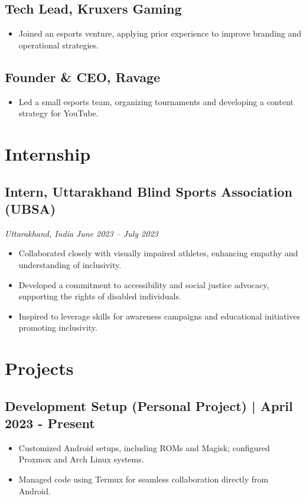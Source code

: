 \documentclass[a4paper,10pt]{article}
\begin{document}
\subsection*{Tech Lead, Kruxers Gaming}
\begin{itemize}[left=0em, itemsep=3pt]
    \item Joined an esports venture, applying prior experience to improve branding and operational strategies.
\end{itemize}

\subsection*{Founder \& CEO, Ravage}
\begin{itemize}[left=0em, itemsep=3pt]
    \item Led a small esports team, organizing tournaments and developing a content strategy for YouTube.
\end{itemize}

\section*{Internship}

\subsection*{Intern, Uttarakhand Blind Sports Association (UBSA)}
\textit{Uttarakhand, India} \hfill \textit{June 2023 – July 2023} \\
\begin{itemize}[left=0em, itemsep=3pt]
    \item Collaborated closely with visually impaired athletes, enhancing empathy and understanding of inclusivity.
    \item Developed a commitment to accessibility and social justice advocacy, supporting the rights of disabled individuals.
    \item Inspired to leverage skills for awareness campaigns and educational initiatives promoting inclusivity.
\end{itemize}

\section*{Projects}

\subsection*{Development Setup (Personal Project) | April 2023 - Present}
\begin{itemize}[left=0em, itemsep=3pt]
    \item Customized Android setups, including ROMs and Magisk; configured Proxmox and Arch Linux systems.
    \item Managed code using Termux for seamless collaboration directly from Android.
\end{itemize}
\end{document}
